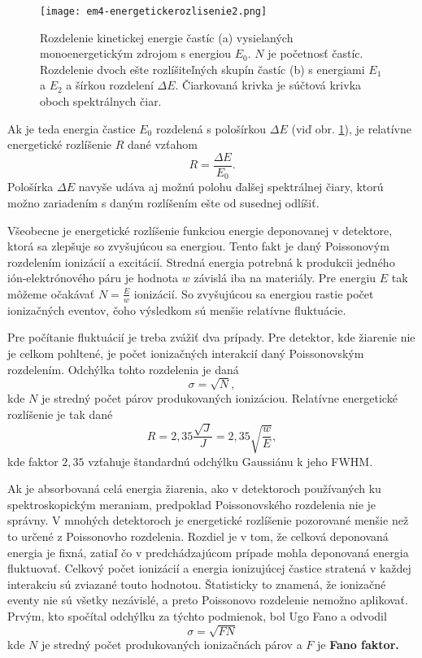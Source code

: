 \documentclass[../../main.tex]{subfiles}
\begin{document}
\begin{figure}[h]
\centering
\texttt{[image: em4-energetickerozlisenie2.png]}
\caption{Rozdelenie kinetickej energie častíc (a) vysielaných monoenergetickým zdrojom s energiou $E_0$. $N$ je početnosť častíc. Rozdelenie dvoch ešte rozlíšiteľných skupín častíc (b) s energiami $E_1$ a $E_2$ a šírkou rozdelení $\Delta E$. Čiarkovaná krivka je súčtová krivka oboch spektrálnych čiar.}
\label{em4:img:energetickerozlisenie2}
\end{figure}

Ak je teda energia častice $E_0$ rozdelená s pološírkou $\Delta E$ (viď obr. \ref{em4:img:energetickerozlisenie2}), je relatívne energetické rozlíšenie $R$ dané vzťahom
\begin{equation}
R=\dfrac{\Delta E}{E_0}.
\end{equation}
Pološírka $\Delta E$ navyše udáva aj možnú polohu ďalšej spektrálnej čiary, ktorú možno zariadením s daným rozlíšením ešte od susednej odlíšiť.

Všeobecne je energetické rozlíšenie funkciou energie deponovanej v detektore, ktorá sa zlepšuje so zvyšujúcou sa energiou. Tento fakt je daný Poissonovým rozdelením ionizácií a excitácií. Stredná energia potrebná k produkcii jedného ión-elektrónového páru je hodnota $w$ závislá iba na materiály. Pre energiu $E$ tak môžeme očakávať $N=\frac{E}{w}$ ionizácií. So zvyšujúcou sa energiou rastie počet ionizačných eventov, čoho výsledkom sú menšie relatívne fluktuácie.

Pre počítanie fluktuácií je treba zvážiť dva prípady. Pre detektor, kde žiarenie nie je celkom pohltené, je počet ionizačných interakcií daný Poissonovským rozdelením. Odchýlka tohto rozdelenia je daná
\begin{equation}
\sigma = \sqrt{N},
\end{equation}
kde $N$ je stredný počet párov produkovaných ionizáciou. Relatívne energetické rozlíšenie je tak dané
\begin{equation}
R=2,35\dfrac{\sqrt{J}}{J}=2,35\sqrt{\dfrac{w}{E}},
\end{equation}
kde faktor $2,35$ vzťahuje štandardnú odchýlku Gaussiánu k jeho FWHM. 

Ak je absorbovaná celá energia žiarenia, ako v detektoroch používaných ku spektroskopickým meraniam, predpoklad Poissonovského rozdelenia nie je správny. V mnohých detektoroch je energetické rozlíšenie pozorované menšie než to určené z Poissonovho rozdelenia. Rozdiel je v tom, že celková deponovaná energia je fixná, zatiaľ čo v predchádzajúcom prípade mohla deponovaná energia fluktuovať. Celkový počet ionizácií a energia ionizujúcej častice stratená v každej interakciu sú zviazané touto hodnotou. Štatisticky to znamená, že ionizačné eventy nie sú všetky nezávislé, a preto Poissonovo rozdelenie nemožno aplikovať. Prvým, kto spočítal odchýlku za týchto podmienok, bol Ugo Fano a odvodil
\begin{equation}
\sigma = \sqrt{FN}
\end{equation}
kde $N$ je stredný počet produkovaných ionizačnách párov a $F$ je \textbf{Fano faktor.}
\end{document}

